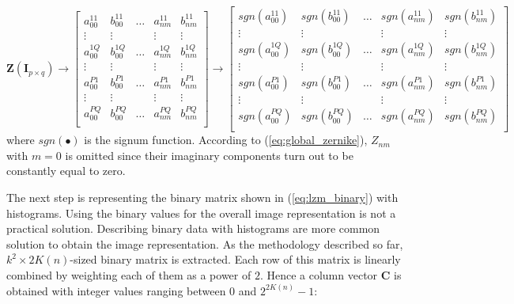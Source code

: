 \documentclass[]{spie}  %
\begin{document}
\begin{equation}
\mathbf{Z} ( \mathbf{I}_{p\times q} )
 \longrightarrow
 \begin{bmatrix}
a_{00}^{11} & b_{00}^{11} & \hdots & a_{nm}^{11}  & b_{nm}^{11} \\
  \vdots  & \vdots & & \vdots  & \vdots\\
a_{00}^{1Q} & b_{00}^{1Q} & \hdots & a_{nm}^{1Q}  & b_{nm}^{1Q} \\
  \vdots  & \vdots & & \vdots  & \vdots\\
a_{00}^{P1} & b_{00}^{P1} & \hdots & a_{nm}^{P1}  & b_{nm}^{P1} \\
  \vdots  & \vdots & & \vdots  & \vdots\\
a_{00}^{PQ} & b_{00}^{PQ} & \hdots & a_{nm}^{PQ}  & b_{nm}^{PQ} \\
 \end{bmatrix}
  \longrightarrow
  \begin{bmatrix}
sgn(a_{00}^{11}) & sgn(b_{00}^{11}) & \hdots & sgn(a_{nm}^{11}) & sgn(b_{nm}^{11}) \\
  \vdots  & \vdots & & \vdots  & \vdots\\
sgn(a_{00}^{1Q}) & sgn(b_{00}^{1Q}) & \hdots & sgn(a_{nm}^{1Q}) & sgn(b_{nm}^{1Q}) \\
  \vdots  & \vdots & & \vdots  & \vdots\\
sgn(a_{00}^{P1}) & sgn(b_{00}^{P1}) & \hdots & sgn(a_{nm}^{P1}) & sgn(b_{nm}^{P1}) \\
  \vdots  & \vdots & & \vdots  & \vdots\\
sgn(a_{00}^{PQ}) & sgn(b_{00}^{PQ}) & \hdots & sgn(a_{nm}^{PQ}) & sgn(b_{nm}^{PQ}) \\
 \end{bmatrix}
 \label{eq:lzm_binary}
\end{equation}
where $sgn(\bullet)$ is the signum function. According to (\ref{eq:global_zernike}), $Z_{nm}$ with $m = 0$ is omitted since their imaginary components turn out to be constantly equal to zero. 

The next step is representing the binary matrix shown in (\ref{eq:lzm_binary}) with histograms. Using the binary values for the overall image representation is not a practical solution. Describing binary data with histograms are more common solution to obtain the image representation. As the methodology described so far, $k^2\times 2K(n)$-sized binary matrix is extracted. Each row of this matrix is linearly combined by weighting each of them as a power of $2$. Hence a column vector $\mathbf{C}$ is obtained with integer values ranging between $0$ and $2^{2K(n)}-1$:
\end{document}
